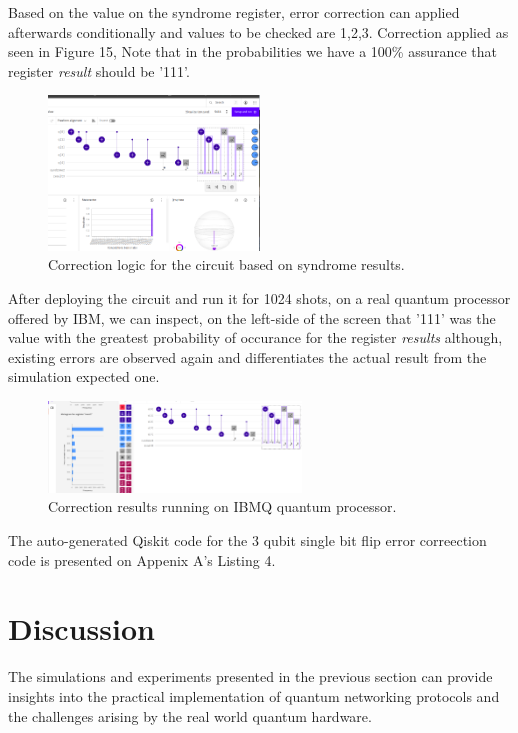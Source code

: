 \documentclass[12pt]{ieeetj}
\begin{document}
		Based on the value on the syndrome register, error correction can applied afterwards conditionally and values to be
		checked are {1,2,3}.
		Correction applied as seen in Figure 15,
		Note that in the probabilities we have a 100\% assurance that register \textit{result} should be '111'.
		\begin{figure}[H]
			\centering
			\includegraphics[width=0.5\textwidth]{ibmq/correction_circ.png}
			\caption{Correction logic for the circuit based on syndrome results.}
			\label{fig15:}
		\end{figure}		
		

		After deploying the circuit and run it for 1024 shots, on a real quantum processor offered by
		IBM, we can inspect, on the left-side of the screen that '111' was the value with the greatest probability
		of occurance for the register \textit{results} although, existing errors are observed again and differentiates the
		actual result from the simulation expected one.
		\begin{figure}[H]
			\centering
			\includegraphics[width=0.6\textwidth]{ibmq/result_correction.png}
			\caption{Correction results running on IBMQ quantum processor.}
			\label{fig15:}
		\end{figure}		
		
		The auto-generated Qiskit code for the 3 qubit single bit flip error correection code is presented on
		Appenix A's Listing 4.

	\section{Discussion}
	

	The simulations and experiments presented in the previous section can provide insights into the practical implementation 
	of quantum networking protocols and the challenges arising by the real world quantum hardware. 
\end{document}
